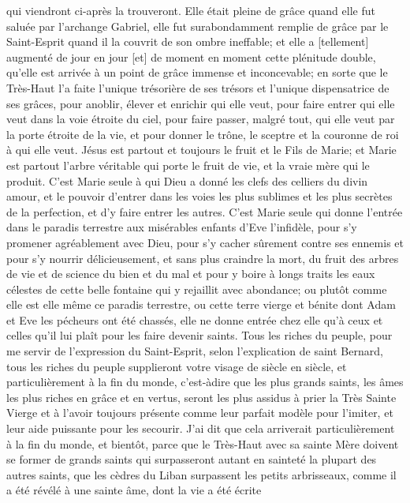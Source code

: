 qui viendront ci-après la trouveront. Elle était pleine de grâce quand elle fut saluée par l'archange Gabriel, elle fut
surabondamment remplie de grâce par le Saint-Esprit quand il la couvrit de son ombre ineffable; et elle a
[tellement] augmenté de jour en jour [et] de moment en moment cette plénitude double, qu'elle est arrivée à un
point de grâce immense et inconcevable; en sorte que le Très-Haut l'a faite l'unique trésorière de ses trésors et
l'unique dispensatrice de ses grâces, pour anoblir, élever et enrichir qui elle veut, pour faire entrer qui elle veut
dans la voie étroite du ciel, pour faire passer, malgré tout, qui elle veut par la porte étroite de la vie, et pour donner
le trône, le sceptre et la couronne de roi à qui elle veut. Jésus est partout et toujours le fruit et le Fils de Marie; et
Marie est partout l'arbre véritable qui porte le fruit de vie, et la vraie mère qui le produit.
 C'est Marie seule à qui Dieu a donné les clefs des celliers du divin amour, et le pouvoir d'entrer dans les voies
les plus sublimes et les plus secrètes de la perfection, et d'y faire entrer les autres. C'est Marie seule qui donne
l'entrée dans le paradis terrestre aux misérables enfants d'Eve l'infidèle, pour s'y promener agréablement avec
Dieu, pour s'y cacher sûrement contre ses ennemis et pour s'y nourrir délicieusement, et sans plus craindre la
mort, du fruit des arbres de vie et de science du bien et du mal et pour y boire à longs traits les eaux célestes de
cette belle fontaine qui y rejaillit avec abondance; ou plutôt comme elle est elle même ce paradis terrestre, ou cette
terre vierge et bénite dont Adam et Eve les pécheurs ont été chassés, elle ne donne entrée chez elle qu'à ceux et
celles qu'il lui plaît pour les faire devenir saints.
 Tous les riches du peuple, pour me servir de l'expression du Saint-Esprit, selon l'explication de saint Bernard,
tous les riches du peuple supplieront votre visage de siècle en siècle, et particulièrement à la fin du monde, c'est-àdire que les plus grands saints, les âmes les plus riches en grâce et en vertus, seront les plus assidus à prier la
Très Sainte Vierge et à l'avoir toujours présente comme leur parfait modèle pour l'imiter, et leur aide puissante
pour les secourir.
 J'ai dit que cela arriverait particulièrement à la fin du monde, et bientôt, parce que le Très-Haut avec sa sainte
Mère doivent se former de grands saints qui surpasseront autant en sainteté la plupart des autres saints, que les
cèdres du Liban surpassent les petits arbrisseaux, comme il a été révélé à une sainte âme, dont la vie a été écrite
